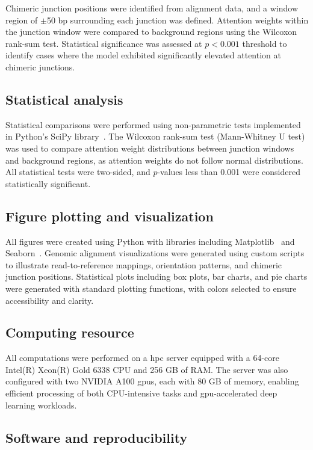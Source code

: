 \documentclass[pdflatex,sn-nature]{sn-jnl}%
\theoremstyle{thmstyleone}%
\theoremstyle{thmstyletwo}%
\theoremstyle{thmstylethree}%
\begin{document}
Chimeric junction positions were identified from alignment data, and a window region of $\pm$50 bp surrounding each junction was defined.
Attention weights within the junction window were compared to background regions using the Wilcoxon rank-sum test.
Statistical significance was assessed at $p < 0.001$ threshold to identify cases where the model exhibited significantly elevated attention at chimeric junctions.

\subsection*{Statistical analysis}

Statistical comparisons were performed using non-parametric tests implemented in Python's SciPy library~\cite{2020SciPy-NMeth}.
The Wilcoxon rank-sum test (Mann-Whitney U test) was used to compare attention weight distributions between junction windows and background regions, as attention weights do not follow normal distributions.
All statistical tests were two-sided, and $p$-values less than 0.001 were considered statistically significant.

\subsection*{Figure plotting and visualization}

All figures were created using Python with libraries including Matplotlib~\cite{Hunter2007} and Seaborn~\cite{Waskom2021}.
Genomic alignment visualizations were generated using custom scripts to illustrate read-to-reference mappings, orientation patterns, and chimeric junction positions.
Statistical plots including box plots, bar charts, and pie charts were generated with standard plotting functions, with colors selected to ensure accessibility and clarity.

\subsection*{Computing resource}

All computations were performed on a \gls{hpc} server equipped with a 64-core Intel(R) Xeon(R) Gold 6338 CPU and 256 GB of RAM.
The server was also configured with two NVIDIA A100 \glspl{gpu}, each with 80 GB of memory, enabling efficient processing of both CPU-intensive tasks and \gls{gpu}-accelerated deep learning workloads.

\subsection*{Software and reproducibility}
\end{document}
